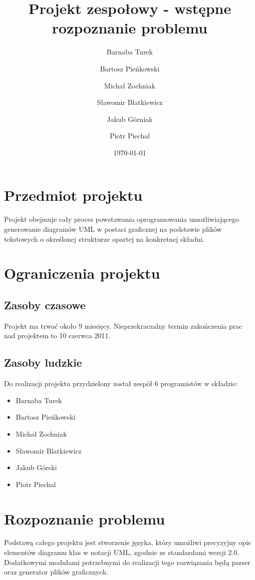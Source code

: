 \documentclass[a4paper,11pt,notitlepage]{article}
\author{
  Barnaba Turek\and
  Bartosz Pieńkowski\and
  Michał Zochniak \and
  Sławomir Blatkiewicz\and
  Jakub Górniak\and
  Piotr Piechal
}
\title{Projekt zespołowy - wstępne rozpoznanie problemu}
\date{\today}
\begin{document}
\maketitle %
\tableofcontents
\section{Przedmiot projektu}
Projekt obejmuje cały proces powstawania oprogramowania umożliwiającego generowanie diagramów UML w postaci graficznej na podstawie plików tekstowych o określonej strukturze opartej na konkretnej składni.
\section{Ograniczenia projektu}
\subsection{Zasoby czasowe}
Projekt ma trwać około 9 miesięcy. Nieprzekraczalny termin zakończenia prac nad projektem to 10 czerwca 2011.
\subsection{Zasoby ludzkie}
Do realizacji projektu przydzielony został zespół 6 programistów w składzie:
  \begin{itemize}
    \item{Barnaba Turek}
    \item{Bartosz Pieńkowski}
    \item{Michał Zochniak}
    \item{Sławomir Blatkiewicz}
    \item{Jakub Górski}
    \item{Piotr Piechal}
  \end{itemize}
\section{Rozpoznanie problemu}
Podstawą całego projektu jest stworzenie języka, który umożliwi precyzyjny opis elementów diagramu klas w notacji UML, zgodnie ze standardami wersji 2.0.
Dodatkowymi modułami potrzebnymi do realizacji tego rozwiązania będą parser oraz generator plików graficznych.
\end{document}
